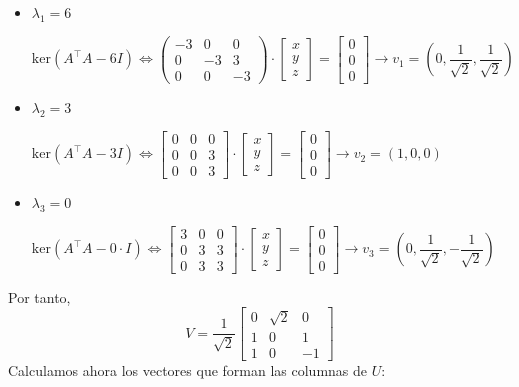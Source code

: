 \begin{itemize}[label=\color{lightblue}\textbullet]
	\item $\lambda_1=6$
	
	$\mathrm{ker}(A^\intercal A-6I)\Longleftrightarrow\begin{pmatrix}
		-3 & 0 & 0 \\
		0 & -3 & 3 \\
		0 & 0 & -3
	\end{pmatrix}\cdot\begin{bmatrix}
		x\\
		y\\
		z
	\end{bmatrix}=\begin{bmatrix}
		0\\
		0\\
		0
	\end{bmatrix}\longrightarrow v_1=\left(0,\dfrac{1}{\sqrt{2}},\dfrac{1}{\sqrt{2}}\right)$
	\item $\lambda_2=3$
	
	$\mathrm{ker}(A^\intercal A-3I)\Longleftrightarrow\begin{bmatrix}
		0 & 0 & 0 \\
		0 & 0 & 3 \\
		0 & 0 & 3
	\end{bmatrix}\cdot\begin{bmatrix}
		x\\
		y\\
		z
	\end{bmatrix}=\begin{bmatrix}
		0\\
		0\\
		0
	\end{bmatrix}\longrightarrow v_2=(1,0,0)$
	\item $\lambda_3=0$
	
	$\mathrm{ker}(A^\intercal A-0\cdot I)\Longleftrightarrow\begin{bmatrix}
		3 & 0 & 0 \\
		0 & 3 & 3 \\
		0 & 3 & 3
	\end{bmatrix}\cdot\begin{bmatrix}
		x\\
		y\\
		z
	\end{bmatrix}=\begin{bmatrix}
		0\\
		0\\
		0
	\end{bmatrix}\longrightarrow v_3=\left(0,\dfrac{1}{\sqrt{2}},-\dfrac{1}{\sqrt{2}}\right)$
\end{itemize}
Por tanto, \[ V=\dfrac{1}{\sqrt{2}}\begin{bmatrix}
	0 & \sqrt{2} & 0 \\
	1 & 0 & 1 \\
	1 & 0 & -1
\end{bmatrix} \]
Calculamos ahora los vectores que forman las columnas de $U$:


